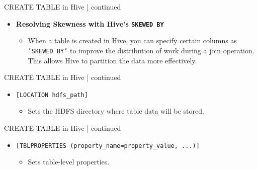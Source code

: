 		\begin{frame}{CREATE TABLE in Hive | continued}
			\begin{tcolorbox}[colback=white,colframe=black,title= Part 8: Table Location]
				\small
				\begin{itemize}
			  		\item \textbf{Resolving Skewness with Hive's \texttt{SKEWED BY} }
			  		\begin{itemize}
						\item When a table is created in Hive, you can specify certain columns as \texttt{'SKEWED BY'} to improve the distribution of work during a join operation. This allows Hive to partition the data more effectively.
			  		\end{itemize}
				\end{itemize}
			\end{tcolorbox}	
		\end{frame}
	
 \begin{frame}{CREATE TABLE in Hive | continued}
	\begin{tcolorbox}[colback=white,colframe=black,title= Part 8: Table Location]
		\small
		\begin{itemize}
			\item \texttt{[LOCATION hdfs\_path]}
			\begin{itemize}
				\item Sets the HDFS directory where table data will be stored.
			\end{itemize}
		\end{itemize}
	\end{tcolorbox}	
\end{frame}
  
  \begin{frame}{CREATE TABLE in Hive | continued}
	\begin{tcolorbox}[colback=white,colframe=black,title= Part 9: Table Properties]
		\small
	\begin{itemize}
	  \item \texttt{[TBLPROPERTIES (property\_name=property\_value, ...)]}
	  \begin{itemize}
		\item Sets table-level properties.
	  \end{itemize}
	\end{itemize}
	\end{tcolorbox}
  \end{frame}
  
